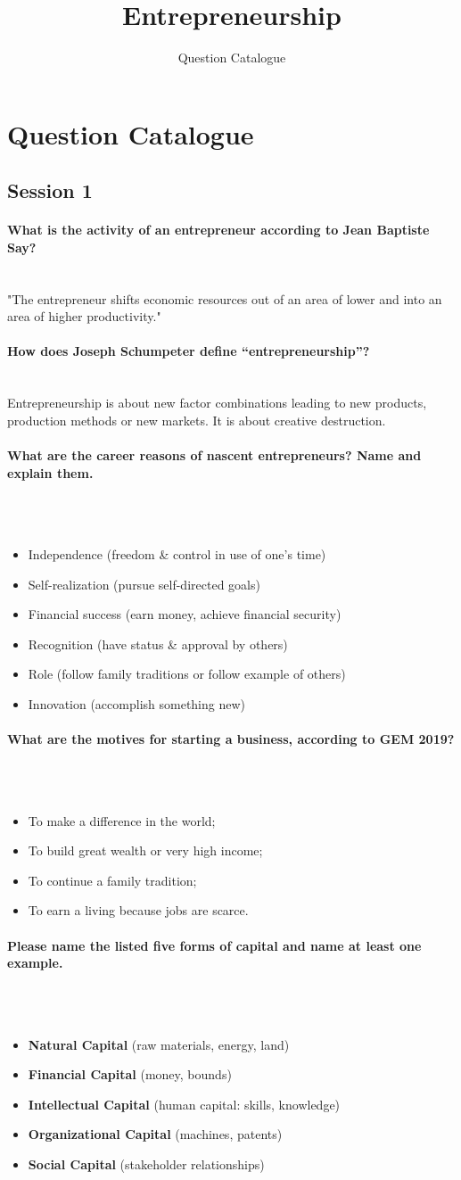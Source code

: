 \documentclass[10pt,a4paper,noendnumber=true]{scrartcl}
\title{Entrepreneurship}
\subtitle{Question Catalogue}
\author{}
\newcommand{\properparagraph}[1]{\paragraph{\textcolor{Emerald}{#1}}\mbox{}\\}
\begin{document}
\maketitle

\section{Question Catalogue}
\subsection{Session 1}
\properparagraph{What is the activity of an entrepreneur according to Jean Baptiste Say?}
"The entrepreneur shifts economic resources out of an area of lower and into an area of higher productivity."

\properparagraph{How does Joseph Schumpeter define “entrepreneurship”?}
Entrepreneurship is about new factor combinations
leading to new products, production methods or new
markets. It is about creative destruction.

\properparagraph{What are the career reasons of nascent entrepreneurs? Name and explain them.}
\\[-6ex]
\begin{itemize}
	\item Independence (freedom \& control in use of one’s time)
	\item Self-realization (pursue self-directed goals)
	\item Financial success (earn money, achieve financial security)
	\item Recognition (have status \& approval by others)
	\item Role (follow family traditions or follow example of others)
	\item Innovation (accomplish something new)
\end{itemize}

\properparagraph{What are the motives for starting a business, according to GEM 2019?}
\\[-6ex]
\begin{itemize}
	\item To make a difference in the world;
	\item To build great wealth or very high income;
	\item To continue a family tradition;
	\item To earn a living because jobs are scarce.
\end{itemize}

\properparagraph{Please name the listed five forms of capital and name at least one example.}
\\[-6ex]
\begin{itemize}
	\item \textbf{Natural Capital} (raw materials, energy, land)
	\item \textbf{Financial Capital} (money, bounds)
	\item \textbf{Intellectual Capital} (human capital: skills, knowledge)
	\item \textbf{Organizational Capital} (machines, patents)
	\item \textbf{Social Capital} (stakeholder relationships)
\end{itemize}
\end{document}
